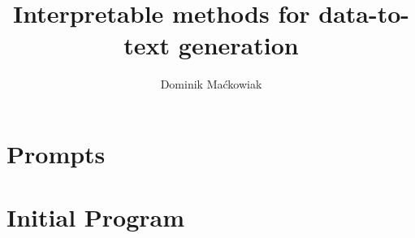 \documentclass[english,master,a4paper,oneside]{ppfcmthesis}
\author{%
   Dominik Maćkowiak \album{151915}}
\title{Interpretable methods for data-to-text generation}
\begin{document}
\frontmatter\pagestyle{empty}%
\maketitle\cleardoublepage%




\vfill\cleardoublepage%


\pagestyle{ppfcmthesis}%
\tableofcontents*
\cleardoublepage


\mainmatter%











\vfill\cleardoublepage%


{\raggedright\sloppy\small}


\appendix
\chapter{Prompts}
\label{app:prompts}







\chapter{Initial Program}
\label{app:initial-program}



\ppcolophon
\end{document}
